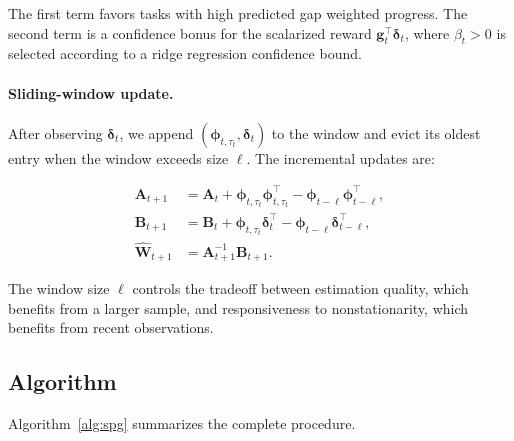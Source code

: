 \documentclass{article} %
\begin{document}
The first term favors tasks with high predicted gap weighted progress. The second term is a confidence bonus for the scalarized reward \(\mathbf{g}_t^\top\boldsymbol{\delta}_t\), where \(\beta_t>0\) is selected according to a ridge regression confidence bound.

\paragraph{Sliding-window update.}
After observing \(\boldsymbol{\delta}_t\), we append \((\boldsymbol{\phi}_{t,\tau_t},\boldsymbol{\delta}_t)\) to the window and evict its oldest entry when the window exceeds size \(\ell\). The incremental updates are:

\begin{align*}
    \mathbf{A}_{t+1} &= \mathbf{A}_t + \boldsymbol{\phi}_{t,\tau_t}\boldsymbol{\phi}_{t,\tau_t}^\top - \boldsymbol{\phi}_{t-\ell}\boldsymbol{\phi}_{t-\ell}^\top, \\
    \mathbf{B}_{t+1} &= \mathbf{B}_t + \boldsymbol{\phi}_{t,\tau_t}\boldsymbol{\delta}_t^\top - \boldsymbol{\phi}_{t-\ell}\boldsymbol{\delta}_{t-\ell}^\top, \\
    \widehat{\mathbf{W}}_{t+1} &= \mathbf{A}_{t+1}^{-1}\mathbf{B}_{t+1}.
\end{align*}

The window size \(\ell\) controls the tradeoff between estimation quality, which benefits from a larger sample, and responsiveness to nonstationarity, which benefits from recent observations.

\subsection{Algorithm}

Algorithm~\ref{alg:spg} summarizes the complete procedure.
\end{document}
